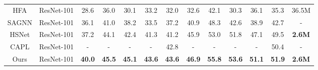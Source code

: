 \documentclass[lettersize,journal]{IEEEtran}
\begin{document}
\begin{table*}
\begin{tabular}{c|c|ccccc|ccccc|c}
HFA \cite{RN84}                     & ResNet-101                & 28.6                   & 36.0                   & 30.1                   & 33.2                   & 32.0                   & 32.6                   & 42.1                   & 30.3                   & 36.1                   & 35.3                      & 36.5M                                                                          \\
SAGNN \cite{RN83}                    & ResNet-101                & 36.1                   & 41.0                   & 38.2                   & 33.5                   & 37.2                   & 40.9                   & 48.3                   & 42.6                   & 38.9                   & 42.7                      & -                                                                              \\
HSNet \cite{RN85}                   & ResNet-101                & 37.2                   & 44.1                   & 42.4                   & 41.3                   & 41.2                   & 45.9                   & 53.0                   & 51.8                   & 47.1                   & 49.5                      & \textbf{\textbf{2.6M}}                                                         \\ 
CAPL \cite{RN64}                    & ResNet-101                 & -                   & -                   & -                   & -                   & 42.8                   & -                   & -                   & -                   & -                   & 50.4                      & -                                                                  \\ 
\hline
Ours                    & ResNet-101                & \textbf{40.0}          & \textbf{45.5}          & \textbf{45.1}          & \textbf{43.6}          & \textbf{43.6}          & \textbf{46.9}          & \textbf{55.8}          & \textbf{53.6}          & \textbf{51.1}          & \textbf{51.9}             & \textbf{2.6M}                                                                  \\
\hline
\end{tabular}
\end{table*}
\end{document}
